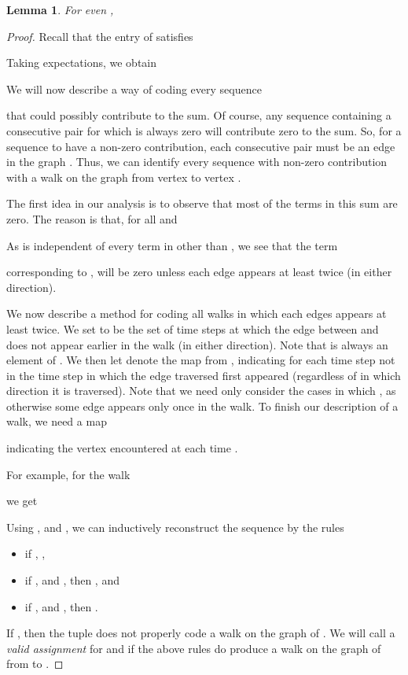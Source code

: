 \documentclass[11pt]{article}
\newtheorem{lemma}[theorem]{Lemma}
\begin{document}
\begin{lemma}\label{lem:trace}
For even ,

\end{lemma}
\begin{proof}
Recall that the  entry of  satisfies

Taking expectations, we obtain

We will now describe a way of coding every sequence
  
  that could
  possibly contribute to the sum.
Of course, any sequence containing a consecutive pair
   for
  which  is always zero
  will contribute zero to the sum.
So, for a sequence to have a non-zero contribution, each
  consecutive pair  must be an edge in the graph .
Thus, we can identify every sequence with non-zero contribution with a walk
  on the graph  from vertex  to vertex .


The first idea in our analysis is to observe that most of the
  terms in this sum are zero.
The reason is that, for all  and 

As  is independent of every
  term in  other than ,
  we see that the term

corresponding to
  , will be zero
  unless each edge  appears at least
  twice (in either direction).


We now describe a method for coding all walks
  in which each edges appears at least twice.
We set  to be the set of time steps 
  at which the edge between  and 
  does not appear earlier in the walk (in either direction).
Note that  is always an element of .
We then let  denote the map from
  , indicating for each
  time step not in  the time step in which
  the edge traversed first appeared (regardless of
  in which direction it is traversed).
Note that we need only consider the cases in which , as
  otherwise some edge appears only once in the walk.
To finish our description of a walk, we need
  a map

indicating the vertex encountered at each time .

For example, for the walk

we get



Using ,  and , we can inductively reconstruct
  the sequence  by the rules
\begin{itemize}
\item if , ,
\item if , and ,
  then , and
\item if , and ,
  then .
\end{itemize}
If ,
  then the tuple  does not properly code
  a walk on the graph of .
We will call  a \textit{valid assignment} for  and  if
  the above rules do produce a walk on the graph of  from 
  to .


\end{proof}
\end{document}
